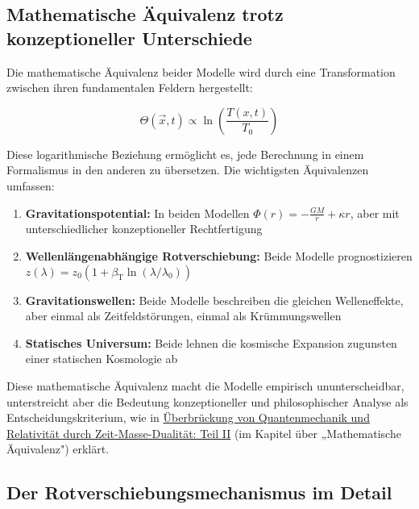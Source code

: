 \documentclass[12pt,a4paper]{article}
\newcommand{\Tfieldt}{T(x,t)}
\newcommand{\betaT}{\beta_{\text{T}}}
\newcommand{\Tzero}{T_0}
\newcommand{\vecx}{\vec{x}}
\begin{document}
	\subsection{Mathematische Äquivalenz trotz konzeptioneller Unterschiede}
	\label{subsec:mathematical_equivalence}
	
	Die mathematische Äquivalenz beider Modelle wird durch eine Transformation zwischen ihren fundamentalen Feldern hergestellt:
	
	\begin{equation}
		\Theta(\vecx,t) \propto \ln\left(\frac{\Tfieldt}{\Tzero}\right)
	\end{equation}
	
	Diese logarithmische Beziehung ermöglicht es, jede Berechnung in einem Formalismus in den anderen zu übersetzen. Die wichtigsten Äquivalenzen umfassen:
	
	\begin{enumerate}
		\item \textbf{Gravitationspotential:} In beiden Modellen $\Phi(r) = -\frac{GM}{r} + \kappa r$, aber mit unterschiedlicher konzeptioneller Rechtfertigung
		
		\item \textbf{Wellenlängenabhängige Rotverschiebung:} Beide Modelle prognostizieren $z(\lambda) = z_0 (1 + \betaT \ln(\lambda/\lambda_0))$
		
		\item \textbf{Gravitationswellen:} Beide Modelle beschreiben die gleichen Welleneffekte, aber einmal als Zeitfeldstörungen, einmal als Krümmungswellen
		
		\item \textbf{Statisches Universum:} Beide lehnen die kosmische Expansion zugunsten einer statischen Kosmologie ab
	\end{enumerate}
	
	Diese mathematische Äquivalenz macht die Modelle empirisch ununterscheidbar, unterstreicht aber die Bedeutung konzeptioneller und philosophischer Analyse als Entscheidungskriterium, wie in \href{https://github.com/jpascher/T0-Time-Mass-Duality/tree/main/2/pdf/English/QMRelTimeMassPart2En.pdf}{Überbrückung von Quantenmechanik und Relativität durch Zeit-Masse-Dualität: Teil II} (im Kapitel über „Mathematische Äquivalenz") erklärt.
	
	\subsection{Der Rotverschiebungsmechanismus im Detail}
	\label{subsec:redshift_mechanism_detail}
	
\end{document}
